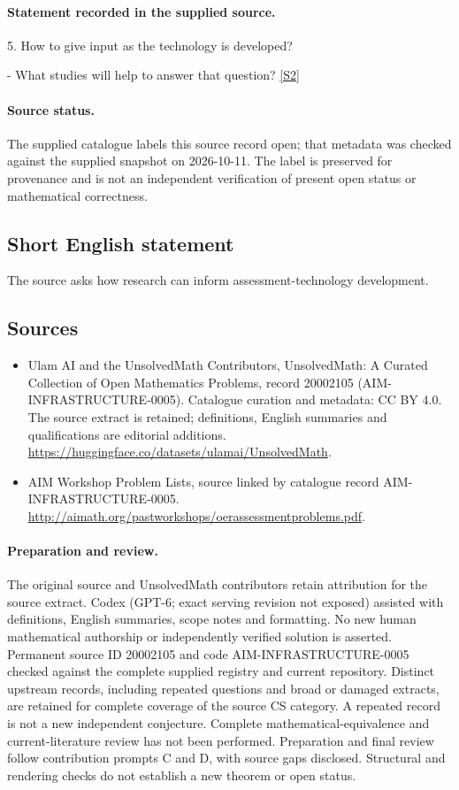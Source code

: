 \documentclass[11pt]{article}
\begin{document}
\paragraph{Statement recorded in the supplied source.}
5. How to give input as the technology is developed?

- What studies will help to answer that question? \href{http://aimath.org/pastworkshops/oerassessmentproblems.pdf}{[S2]}
\paragraph{Source status.}
The supplied catalogue labels this source record open; that metadata was checked against the supplied snapshot on 2026-10-11. The label is preserved for provenance and is not an independent verification of present open status or mathematical correctness.
\subsection{Short English statement}
The source asks how research can inform assessment-technology development.
\subsection{Sources}
\begin{itemize}
\item[S1] Ulam AI and the UnsolvedMath Contributors, UnsolvedMath: A Curated Collection of Open Mathematics Problems, record 20002105 (AIM-INFRASTRUCTURE-0005). Catalogue curation and metadata: CC BY 4.0. The source extract is retained; definitions, English summaries and qualifications are editorial additions.
\url{https://huggingface.co/datasets/ulamai/UnsolvedMath}.
\item[S2] AIM Workshop Problem Lists, source linked by catalogue record AIM-INFRASTRUCTURE-0005.
\url{http://aimath.org/pastworkshops/oerassessmentproblems.pdf}.
\end{itemize}
\paragraph{Preparation and review.}
The original source and UnsolvedMath contributors retain attribution for the source extract. Codex (GPT-6; exact serving revision not exposed) assisted with definitions, English summaries, scope notes and formatting. No new human mathematical authorship or independently verified solution is asserted. Permanent source ID 20002105 and code AIM-INFRASTRUCTURE-0005 checked against the complete supplied registry and current repository. Distinct upstream records, including repeated questions and broad or damaged extracts, are retained for complete coverage of the source CS category. A repeated record is not a new independent conjecture. Complete mathematical-equivalence and current-literature review has not been performed. Preparation and final review follow contribution prompts C and D, with source gaps disclosed. Structural and rendering checks do not establish a new theorem or open status.
\label{end:20002105}
\end{document}
